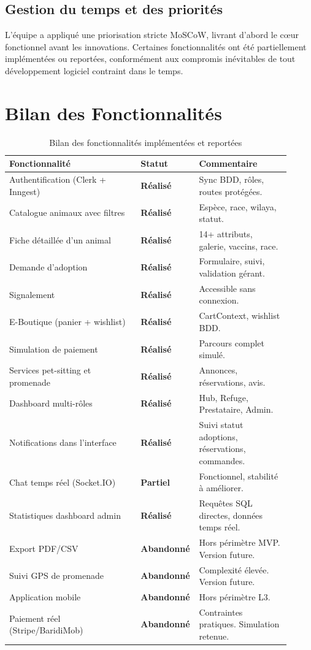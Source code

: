 \documentclass[12pt,a4paper]{report}
\newcommand{\statutOK}{\textcolor{okgreen}{\textbf{Réalisé}}}
\newcommand{\statutPartiel}{\textcolor{warncolor}{\textbf{Partiel}}}
\newcommand{\statutNon}{\textcolor{abandoncolor}{\textbf{Abandonné}}}
\begin{document}
\subsection*{Gestion du temps et des priorités}

L'équipe a appliqué une priorisation stricte MoSCoW, livrant d'abord le cœur fonctionnel avant les innovations. Certaines fonctionnalités ont été partiellement implémentées ou reportées, conformément aux compromis inévitables de tout développement logiciel contraint dans le temps.

\section{Bilan des Fonctionnalités}

\begin{table}[H]
\centering
\begin{tabular}{@{}L{0.46\linewidth}L{0.13\linewidth}L{0.32\linewidth}@{}}
\toprule
\textbf{Fonctionnalité} & \textbf{Statut} & \textbf{Commentaire} \\
\midrule
Authentification (Clerk + Inngest) & \statutOK & Sync BDD, rôles, routes protégées. \\
Catalogue animaux avec filtres & \statutOK & Espèce, race, wilaya, statut. \\
Fiche détaillée d'un animal & \statutOK & 14+ attributs, galerie, vaccins, race. \\
Demande d'adoption & \statutOK & Formulaire, suivi, validation gérant. \\
Signalement & \statutOK & Accessible sans connexion. \\
E-Boutique (panier + wishlist) & \statutOK & CartContext, wishlist BDD. \\
Simulation de paiement & \statutOK & Parcours complet simulé. \\
Services pet-sitting et promenade & \statutOK & Annonces, réservations, avis. \\
Dashboard multi-rôles & \statutOK & Hub, Refuge, Prestataire, Admin. \\
Notifications dans l'interface & \statutOK & Suivi statut adoptions, réservations, commandes. \\
Chat temps réel (Socket.IO) & \statutPartiel & Fonctionnel, stabilité à améliorer. \\
Statistiques dashboard admin & \statutOK & Requêtes SQL directes, données temps réel. \\
Export PDF/CSV & \statutNon & Hors périmètre MVP. Version future. \\
Suivi GPS de promenade & \statutNon & Complexité élevée. Version future. \\
Application mobile & \statutNon & Hors périmètre L3. \\
Paiement réel (Stripe/BaridiMob) & \statutNon & Contraintes pratiques. Simulation retenue. \\
\bottomrule
\end{tabular}
\caption{Bilan des fonctionnalités implémentées et reportées}
\label{tab:bilan}
\end{table}
\end{document}
